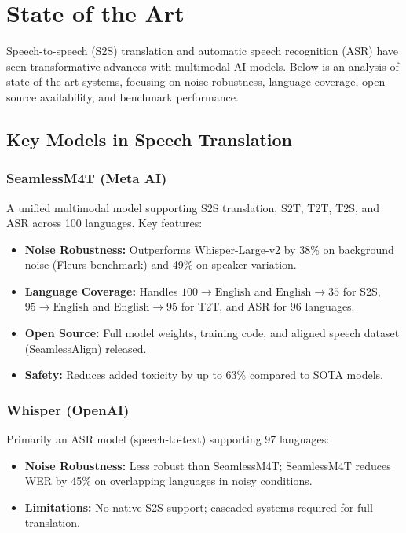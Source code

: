 \section{State of the Art}

Speech-to-speech (S2S) translation and automatic speech recognition (ASR) have seen transformative advances with multimodal AI models. Below is an analysis of state-of-the-art systems, focusing on noise robustness, language coverage, open-source availability, and benchmark performance.

\subsection{Key Models in Speech Translation}

\subsubsection{SeamlessM4T (Meta AI)}
A unified multimodal model supporting S2S translation, S2T, T2T, T2S, and ASR across 100 languages. Key features:

\begin{itemize}
    \item \textbf{Noise Robustness:} Outperforms Whisper-Large-v2 by 38\% on background noise (Fleurs benchmark) and 49\% on speaker variation.
    
    \item \textbf{Language Coverage:} Handles $100 \rightarrow \text{English}$ and $\text{English} \rightarrow 35$ for S2S, $95 \rightarrow \text{English}$ and $\text{English} \rightarrow 95$ for T2T, and ASR for 96 languages.
    
    \item \textbf{Open Source:} Full model weights, training code, and aligned speech dataset (SeamlessAlign) released.
    
    \item \textbf{Safety:} Reduces added toxicity by up to 63\% compared to SOTA models.
\end{itemize}

\subsubsection{Whisper (OpenAI)}
Primarily an ASR model (speech-to-text) supporting 97 languages:

\begin{itemize}
    \item \textbf{Noise Robustness:} Less robust than SeamlessM4T; SeamlessM4T reduces WER by 45\% on overlapping languages in noisy conditions.
    
    \item \textbf{Limitations:} No native S2S support; cascaded systems required for full translation.
\end{itemize}

